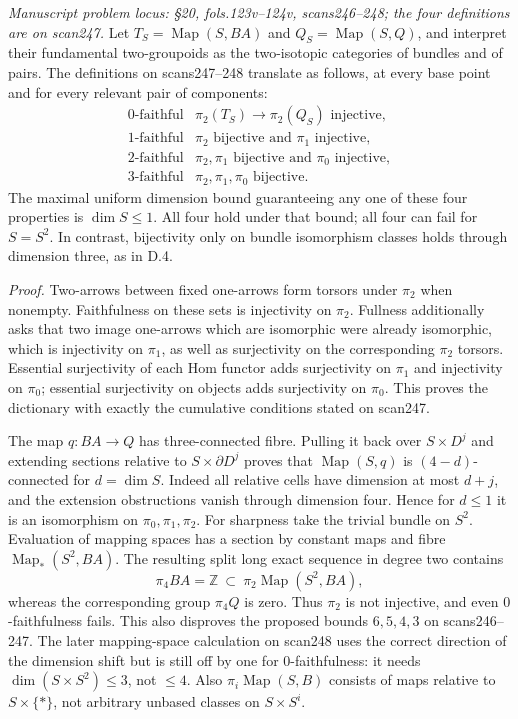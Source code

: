 \emph{Manuscript problem locus: \S20, fols.123v--124v, scans246--248; the four definitions are on scan247.}
Let $T_S=\operatorname{Map}(S,BA)$ and $Q_S=\operatorname{Map}(S,Q)$, and interpret their fundamental two-groupoids as the two-isotopic categories of bundles and of pairs. The definitions on scans247--248 translate as follows, at every base point and for every relevant pair of components:
\[
\begin{array}{c|l}
0\text{-faithful}&\pi_2(T_S)\to\pi_2(Q_S)\text{ injective},\\
1\text{-faithful}&\pi_2\text{ bijective and }\pi_1\text{ injective},\\
2\text{-faithful}&\pi_2,\pi_1\text{ bijective and }\pi_0\text{ injective},\\
3\text{-faithful}&\pi_2,\pi_1,\pi_0\text{ bijective}.
\end{array}
\]
The maximal uniform dimension bound guaranteeing any one of these four properties is $\dim S\leq1$. All four hold under that bound; all four can fail for $S=S^2$. In contrast, bijectivity only on bundle isomorphism classes holds through dimension three, as in D.4.

\emph{Proof.} Two-arrows between fixed one-arrows form torsors under $\pi_2$ when nonempty. Faithfulness on these sets is injectivity on $\pi_2$. Fullness additionally asks that two image one-arrows which are isomorphic were already isomorphic, which is injectivity on $\pi_1$, as well as surjectivity on the corresponding $\pi_2$ torsors. Essential surjectivity of each Hom functor adds surjectivity on $\pi_1$ and injectivity on $\pi_0$; essential surjectivity on objects adds surjectivity on $\pi_0$. This proves the dictionary with exactly the cumulative conditions stated on scan247.

The map $q:BA\to Q$ has three-connected fibre. Pulling it back over $S\times D^j$ and extending sections relative to $S\times\partial D^j$ proves that $\operatorname{Map}(S,q)$ is $(4-d)$-connected for $d=\dim S$. Indeed all relative cells have dimension at most $d+j$, and the extension obstructions vanish through dimension four. Hence for $d\leq1$ it is an isomorphism on $\pi_0,\pi_1,\pi_2$. For sharpness take the trivial bundle on $S^2$. Evaluation of mapping spaces has a section by constant maps and fibre $\operatorname{Map}_*(S^2,BA)$. The resulting split long exact sequence in degree two contains
\[
\pi_4BA=\mathbb Z\ \subset\ \pi_2\operatorname{Map}(S^2,BA),
\]
whereas the corresponding group $\pi_4Q$ is zero. Thus $\pi_2$ is not injective, and even $0$-faithfulness fails. This also disproves the proposed bounds $6,5,4,3$ on scans246--247. The later mapping-space calculation on scan248 uses the correct direction of the dimension shift but is still off by one for $0$-faithfulness: it needs $\dim(S\times S^2)\leq3$, not $\leq4$. Also $\pi_i\operatorname{Map}(S,B)$ consists of maps relative to $S\times\{*\}$, not arbitrary unbased classes on $S\times S^i$.

